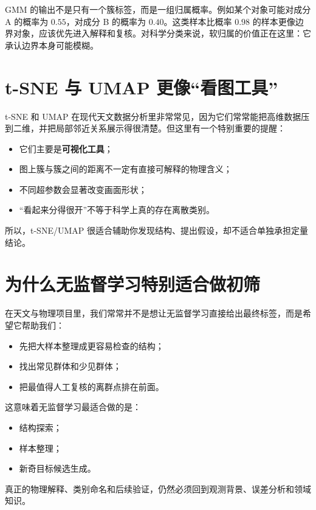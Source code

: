 GMM 的输出不是只有一个簇标签，而是一组归属概率。例如某个对象可能对成分 A 的概率为 \(0.55\)，对成分 B 的概率为 \(0.40\)。这类样本比概率 \(0.98\) 的样本更像边界对象，应该优先进入解释和复核。对科学分类来说，软归属的价值正在这里：它承认边界本身可能模糊。

\section{t-SNE 与 UMAP 更像“看图工具”}

t-SNE 和 UMAP 在现代天文数据分析里非常常见，因为它们常常能把高维数据压到二维，并把局部邻近关系展示得很清楚。但这里有一个特别重要的提醒：

\begin{itemize}
    \item 它们主要是\textbf{可视化工具}；
    \item 图上簇与簇之间的距离不一定有直接可解释的物理含义；
    \item 不同超参数会显著改变画面形状；
    \item “看起来分得很开”不等于科学上真的存在离散类别。
\end{itemize}

所以，t-SNE/UMAP 很适合辅助你发现结构、提出假设，却不适合单独承担定量结论。

\section{为什么无监督学习特别适合做初筛}

在天文与物理项目里，我们常常并不是想让无监督学习直接给出最终标签，而是希望它帮助我们：

\begin{itemize}
    \item 先把大样本整理成更容易检查的结构；
    \item 找出常见群体和少见群体；
    \item 把最值得人工复核的离群点排在前面。
\end{itemize}

这意味着无监督学习最适合做的是：

\begin{itemize}
    \item 结构探索；
    \item 样本整理；
    \item 新奇目标候选生成。
\end{itemize}

真正的物理解释、类别命名和后续验证，仍然必须回到观测背景、误差分析和领域知识。

